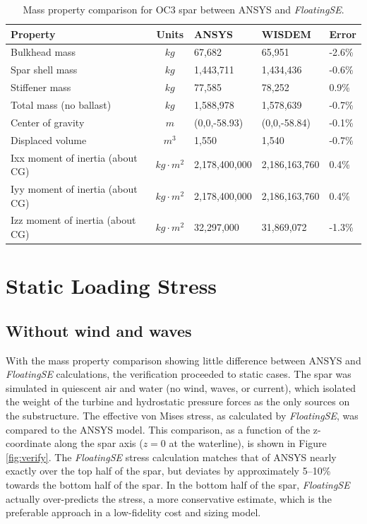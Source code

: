 \begin{table}[htbp] \begin{center}
    \caption{Mass property comparison for OC3 spar between ANSYS and \textit{FloatingSE}.}
    \label{tbl:verify-static}
{\small
  \begin{tabular}{ l c l l l } \hline
    \textbf{Property} & \textbf{Units} & \textbf{ANSYS} & \textbf{WISDEM} & \textbf{Error}\\
    \hline \hline
    Bulkhead mass & $kg$ & 67,682 & 65,951 & -2.6\% \\
    Spar shell mass & $kg$ & 1,443,711 & 1,434,436 & -0.6\%\\
    Stiffener mass  & $kg$ & 77,585 & 78,252 & 0.9\% \\
    Total mass (no ballast) & $kg$ & 1,588,978 & 1,578,639 & -0.7\%\\
    Center of gravity & $m$ & (0,0,-58.93) & (0,0,-58.84) & -0.1\%\\
    Displaced volume & $m^3$ & 1,550 &1,540 & -0.7\% \\
    Ixx moment of inertia (about CG) & $kg\cdot m^2$ & 2,178,400,000 &2,186,163,760 & 0.4\%\\
    Iyy moment of inertia (about CG) & $kg\cdot m^2$ & 2,178,400,000 &2,186,163,760 & 0.4\%\\
    Izz moment of inertia (about CG) & $kg\cdot m^2$ & 32,297,000 & 31,869,072 & -1.3\%\\
  \hline \end{tabular}
}
\end{center} \end{table}

\section{Static Loading Stress}
\subsection{Without wind and waves}
With the mass property comparison showing little difference between
ANSYS and \textit{FloatingSE} calculations, the verification proceeded
to static cases.  The spar was simulated in quiescent air and water
(no wind, waves, or current), which isolated the weight of the turbine
and hydrostatic pressure forces as the only sources on the
substructure.  The effective von Mises stress, as calculated by
\textit{FloatingSE}, was compared to the ANSYS model.  This comparison,
as a function of the z-coordinate along the spar axis ($z=0$ at the
waterline), is shown in Figure \ref{fig:verify}.  The
\textit{FloatingSE} stress calculation matches that of ANSYS nearly
exactly over the top half of the spar, but deviates by approximately
5--10\% towards the bottom half of the spar.  In the bottom half of the
spar, \textit{FloatingSE} actually over-predicts the stress, a more
conservative estimate, which is the preferable approach in a
low-fidelity cost and sizing model.

